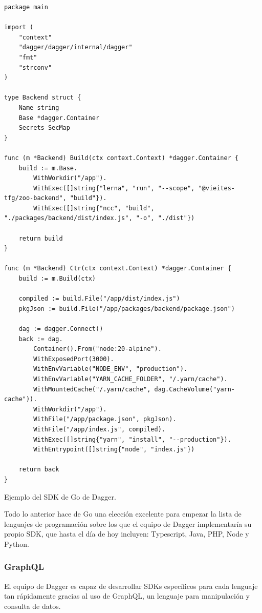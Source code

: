 \begin{longlisting}
  \begin{verbatim}
package main

import (
	"context"
	"dagger/dagger/internal/dagger"
	"fmt"
	"strconv"
)

type Backend struct {
	Name string
	Base *dagger.Container
	Secrets SecMap
}

func (m *Backend) Build(ctx context.Context) *dagger.Container {
	build := m.Base.
		WithWorkdir("/app").
		WithExec([]string{"lerna", "run", "--scope", "@vieites-tfg/zoo-backend", "build"}).
		WithExec([]string{"ncc", "build", "./packages/backend/dist/index.js", "-o", "./dist"})

	return build
}

func (m *Backend) Ctr(ctx context.Context) *dagger.Container {
	build := m.Build(ctx)

	compiled := build.File("/app/dist/index.js")
	pkgJson := build.File("/app/packages/backend/package.json")

	dag := dagger.Connect()
	back := dag.
		Container().From("node:20-alpine").
		WithExposedPort(3000).
		WithEnvVariable("NODE_ENV", "production").
		WithEnvVariable("YARN_CACHE_FOLDER", "/.yarn/cache").
		WithMountedCache("/.yarn/cache", dag.CacheVolume("yarn-cache")).
		WithWorkdir("/app").
		WithFile("/app/package.json", pkgJson).
		WithFile("/app/index.js", compiled).
		WithExec([]string{"yarn", "install", "--production"}).
		WithEntrypoint([]string{"node", "index.js"})

	return back
}
\end{verbatim}
  \caption{Ejemplo del SDK de Go de Dagger.}
  \label{lst:daggergo}
\end{longlisting}

Todo lo anterior hace de Go una elección excelente para empezar la lista de lenguajes de programación sobre los que el equipo de Dagger implementaría su propio SDK, que hasta el día de hoy incluyen: Typescript, Java, PHP, Node y Python. 

\subsubsection*{GraphQL}

El equipo de Dagger es capaz de desarrollar SDKs específicos para cada lenguaje tan rápidamente gracias al uso de GraphQL\cite{graphql}, un lenguaje para manipulación y consulta de datos.

